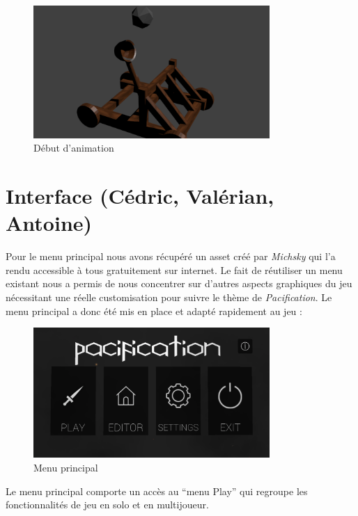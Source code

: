 \documentclass[12pt]{report}
\begin{document}
\begin{figure}[H]
    \centering
    \includegraphics[width=0.8\textwidth]{CatapulteAnimation}
    \caption{Début d'animation}
\end{figure}

\section{Interface (Cédric, Valérian, Antoine)}

Pour le menu principal nous avons récupéré un asset créé par \textit{Michsky}
qui l’a rendu accessible à tous gratuitement sur internet. Le fait de
réutiliser un menu existant nous a permis de nous concentrer sur d'autres
aspects graphiques du jeu nécessitant une réelle customisation pour suivre le
thème de \textit{Pacification}. Le menu principal a donc été mis en place et
adapté rapidement au jeu :

\begin{figure}[H]
    \centering
    \includegraphics[width=0.8\textwidth]{MainMenuScreen}
    \caption{Menu principal}
\end{figure}

Le menu principal comporte un accès au “menu Play” qui regroupe les
fonctionnalités de jeu en solo et en multijoueur.
\end{document}
